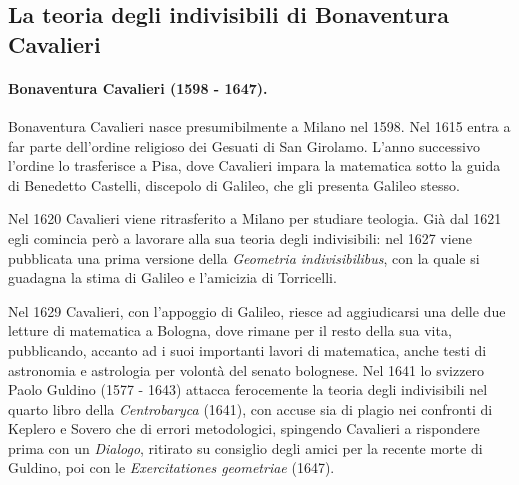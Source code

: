 \subsection{La teoria degli indivisibili di Bonaventura Cavalieri}\label{LaTeoriaDegliIndivisibiliDiBonaventuraCavalieri}
\paragraph{Bonaventura Cavalieri (1598 - 1647).} Bonaventura Cavalieri nasce presumibilmente a Milano nel 1598. Nel 1615 entra a far parte dell'ordine religioso dei Gesuati di San Girolamo. L'anno successivo l'ordine lo trasferisce a Pisa, dove Cavalieri impara la matematica sotto la guida di Benedetto Castelli, discepolo di Galileo, che gli presenta Galileo stesso.
\par Nel 1620 Cavalieri viene ritrasferito a Milano per studiare teologia. Gi\`a dal 1621 egli comincia per\`o a lavorare alla sua teoria degli indivisibili: nel 1627 viene pubblicata una prima versione della \textit{Geometria indivisibilibus}, con la quale si guadagna la stima di Galileo e l'amicizia di Torricelli.
\par Nel 1629 Cavalieri, con l'appoggio di Galileo, riesce ad aggiudicarsi una delle due letture di matematica a Bologna, dove rimane per il resto della sua vita, pubblicando, accanto ad i suoi importanti lavori di matematica, anche testi di astronomia e astrologia per volont\`a del senato bolognese. Nel 1641 lo svizzero Paolo Guldino (1577 - 1643) attacca ferocemente la teoria degli indivisibili nel quarto libro della \textit{Centrobaryca} (1641), con accuse sia di plagio nei confronti di Keplero e Sovero che di errori metodologici, spingendo Cavalieri a rispondere prima con un \textit{Dialogo}, ritirato su consiglio degli amici per la recente morte di Guldino, poi con le \textit{Exercitationes geometriae} (1647).

